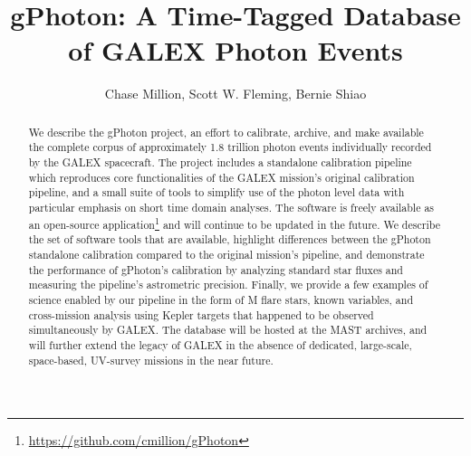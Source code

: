 \documentclass[preprint]{aastex}
\begin{document}
\title{gPhoton: A Time-Tagged Database of GALEX Photon Events}

\author{
Chase Million,
Scott W. Fleming,
Bernie Shiao}



\begin{abstract}
We describe the gPhoton project, an effort to calibrate, archive, and make available the complete corpus of approximately 1.8 trillion photon events individually recorded by the GALEX spacecraft. The project includes a standalone calibration pipeline which reproduces core functionalities of the GALEX mission's original calibration pipeline, and a small suite of tools to simplify use of the photon level data with particular emphasis on short time domain analyses.  The software is freely available as an open-source application\footnote{\url{https://github.com/cmillion/gPhoton}} and will continue to be updated in the future.  We describe the set of software tools that are available, highlight differences between the gPhoton standalone calibration compared to the original mission's pipeline, and demonstrate the performance of gPhoton's calibration by analyzing standard star fluxes and measuring the pipeline's astrometric precision.  Finally, we provide a few examples of science enabled by our pipeline in the form of M flare stars, known variables, and cross-mission analysis using Kepler targets that happened to be observed simultaneously by GALEX.  The database will be hosted at the MAST archives, and will further extend the legacy of GALEX in the absence of dedicated, large-scale, space-based, UV-survey missions in the near future.
\end{abstract}
\end{document}
